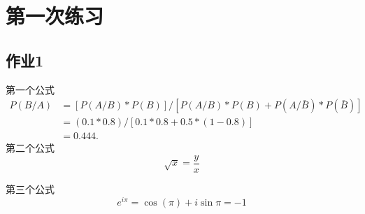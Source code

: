 \documentclass[11pt,UTF8]{ctexbook}
\begin{document}
\fi

\chapter{第一次练习}
\section{作业1}
第一个公式
\begin{align*}
P(B/A)&=[P(A/B)*P(B)]/[P(A/B)*P(B)+P(A/\bar{B})*P(\bar{B})] \nonumber \\
      &=(0.1*0.8)/[0.1*0.8+0.5*(1-0.8)] \nonumber \\
      &=0.444.
\end{align*} 
第二个公式
\begin{equation}
\sqrt{x}=\frac{y}{x}
\end{equation}

第三个公式
\[e^{i\pi}=\cos(\pi)+i\sin\pi=-1\]


\date{\today}


\ifx\allfiles\undefined
\end{document}
